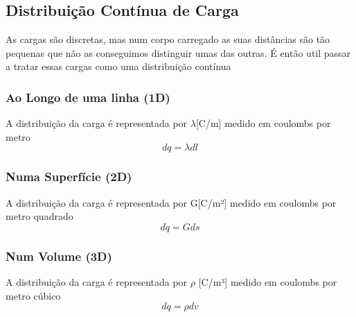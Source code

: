\documentclass[a4paper]{article}
\begin{document}
\subsection{Distribuição Contínua de Carga}
As cargas são discretas, mas num corpo carregado as suas distâncias são tão pequenas que não as conseguimos distinguir umas das outras.
É então util passar a tratar essas cargas como uma distribuição contínua

\subsubsection{Ao Longo de uma linha (1D)}
A distribuição da carga é representada por $\lambda$[C/m] medido em coulombs por metro
\[dq = \lambda dl\]

\subsubsection{Numa Superfície (2D)}
A distribuição da carga é representada por G[C/m²] medido em coulombs por metro quadrado
\[dq = Gds\]

\subsubsection{Num Volume (3D)}
A distribuição da carga é representada por $\rho$ [C/m³] medido em coulombs por metro cúbico
\[dq = \rho dv\]
\end{document}
